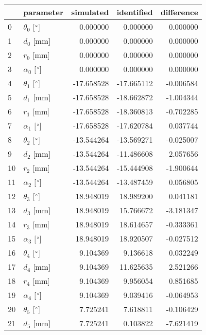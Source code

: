 \documentclass{standalone}%
\begin{document}
%
\normalsize%
\begin{tabular}{llrrr}
\toprule
{} &                 parameter &  simulated & identified & difference \\
\midrule
0  &  $\theta_{0}$ [$\degree$] &   0.000000 &   0.000000 &   0.000000 \\
1  &              $d_{0}$ [mm] &   0.000000 &   0.000000 &   0.000000 \\
2  &              $r_{0}$ [mm] &   0.000000 &   0.000000 &   0.000000 \\
3  &  $\alpha_{0}$ [$\degree$] &   0.000000 &   0.000000 &   0.000000 \\
4  &  $\theta_{1}$ [$\degree$] & -17.658528 & -17.665112 &  -0.006584 \\
5  &              $d_{1}$ [mm] & -17.658528 & -18.662872 &  -1.004344 \\
6  &              $r_{1}$ [mm] & -17.658528 & -18.360813 &  -0.702285 \\
7  &  $\alpha_{1}$ [$\degree$] & -17.658528 & -17.620784 &   0.037744 \\
8  &  $\theta_{2}$ [$\degree$] & -13.544264 & -13.569271 &  -0.025007 \\
9  &              $d_{2}$ [mm] & -13.544264 & -11.486608 &   2.057656 \\
10 &              $r_{2}$ [mm] & -13.544264 & -15.444908 &  -1.900644 \\
11 &  $\alpha_{2}$ [$\degree$] & -13.544264 & -13.487459 &   0.056805 \\
12 &  $\theta_{3}$ [$\degree$] &  18.948019 &  18.989200 &   0.041181 \\
13 &              $d_{3}$ [mm] &  18.948019 &  15.766672 &  -3.181347 \\
14 &              $r_{3}$ [mm] &  18.948019 &  18.614657 &  -0.333361 \\
15 &  $\alpha_{3}$ [$\degree$] &  18.948019 &  18.920507 &  -0.027512 \\
16 &  $\theta_{4}$ [$\degree$] &   9.104369 &   9.136618 &   0.032249 \\
17 &              $d_{4}$ [mm] &   9.104369 &  11.625635 &   2.521266 \\
18 &              $r_{4}$ [mm] &   9.104369 &   9.956054 &   0.851685 \\
19 &  $\alpha_{4}$ [$\degree$] &   9.104369 &   9.039416 &  -0.064953 \\
20 &  $\theta_{5}$ [$\degree$] &   7.725241 &   7.618811 &  -0.106429 \\
21 &              $d_{5}$ [mm] &   7.725241 &   0.103822 &  -7.621419 \\

\end{tabular}
\end{document}
